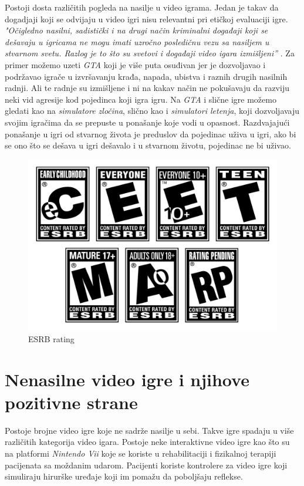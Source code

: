 \documentclass[a4paper]{article}
\begin{document}
Postoji dosta različitih pogleda na nasilje u video igrama. Jedan je takav da dogadjaji koji se odvijaju
u video igri nisu relevantni pri etičkoj evaluaciji igre. {\em "Očigledno nasilni, sadistički i na drugi način kriminalni događaji koji se dešavaju u igricama ne mogu imati uzročno posledičnu vezu sa nasiljem u stvarnom svetu. Razlog je to što su svetovi i događaji video igara izmišljeni''} \cite{tavinor}. Za primer možemo uzeti {\em GTA} koji je
više puta osuđivan jer je dozvoljavao i podržavao igrače u izvršavanju krađa, napada, ubistva i raznih drugih nasilnih radnji.
Ali te radnje su izmišljene i ni na kakav način ne pokušavaju da razviju neki vid agresije kod pojedinca koji igra igru.
Na {\em GTA} i slične igre možemo gledati kao na {\em simulatore zločina}, slično kao i  {\em simulatori letenja},
koji dozvoljavaju svojim igračima da se prepuste u ponašanje koje vodi u opasnost. Razdvajajući ponašanje u igri
od stvarnog života je preduslov da pojedinac uživa u igri, ako bi se ono što se dešava u igri dešavalo i u stvarnom životu,
pojedinac ne bi uživao.

\begin{figure}[h!]
	\begin{center}
		\includegraphics[scale=0.2]{ESRB.jpg}
	\end{center}
	\caption{ESRB rating}
\end{figure}

\newpage

\section{Nenasilne video igre i njihove pozitivne strane}	
\label{sec:nenasilne}
Postoje brojne video igre koje ne sadrže nasilje u sebi. Takve igre spadaju u više različitih
kategorija video igara. Postoje neke interaktivne video igre kao što su na platformi {\em Nintendo Vii} koje se
koriste u rehabilitaciji i fizikalnoj terapiji pacijenata sa moždanim udarom. Pacijenti koriste kontrolere za video igre koji simuliraju
hirurške uređaje koji im pomažu da poboljšaju reflekse.
\end{document}
